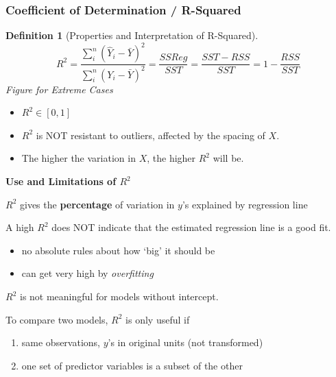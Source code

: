 \documentclass[11pt]{article}
\theoremstyle{definition}
\newtheorem{definition}{Definition}[section]
\numberwithin{equation}{section}
\begin{document}
\subsubsection{Coefficient of Determination / R-Squared}
\begin{definition}[Properties and Interpretation of R-Squared]
  \begin{equation}\label{R-Squared}
    R^2 = \frac{\sum^n_i(\hat{Y}_i - \bar{Y})^2}{\sum^n_i(Y_i - \bar{Y})^2} = \frac{SSReg}{SST} = \frac{SST-RSS}{SST} = 1 - \frac{RSS}{SST}
  \end{equation}
\textit{Figure for Extreme Cases}
\begin{itemize}
  \item $R^2\in[0,1]$
  \item $R^2$ is NOT resistant to outliers, affected by the spacing of $X$.
  \item The higher the variation in $X$, the higher $R^2$ will be.
\end{itemize}
\end{definition}

\textbf{Use and Limitations of $R^2$}

$R^2$ gives the \textbf{percentage} of variation in $y$'s explained by regression line

A high $R^2$ does NOT indicate that the estimated regression line is a good fit. 
\begin{itemize}
  \item no absolute rules about how `big' it should be
  \item can get very high by \textit{overfitting}
\end{itemize}

$R^2$ is not meaningful for models without intercept.

To compare two models, $R^2$ is only useful if
\begin{enumerate}
  \item same observations, $y$'s in original units (not transformed)
  \item one set of predictor variables is a subset of the other
\end{enumerate}
\end{document}
